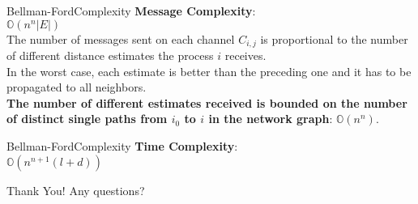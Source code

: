 \documentclass[pdf]{beamer}
\begin{document}
\begin{frame}{Bellman-Ford}{Complexity}
    \textbf{Message Complexity}: \\
    \vspace{8pt}
    $\mathbb{O}(n^n |E|)$ \\
    \vspace{8pt}
    \small
    The number of messages sent on each channel $C_{i, j}$ is proportional to the number of different distance estimates the process $i$ receives. \\
    \vspace{8pt}
    In the worst case, each estimate is better than the preceding one and it has to be propagated to all neighbors. \\
    \vspace{8pt}
    \textbf{The number of different estimates received is bounded on the number of distinct single paths from $i_0$ to $i$ in the network graph}: $\mathbb{O}(n^n)$.
\end{frame}

\begin{frame}{Bellman-Ford}{Complexity}
    \normalsize
    \textbf{Time Complexity}: \\
    \vspace{12pt}
    \pause
    $\mathbb{O}(n^{n+1}(l+d))$ \\
\end{frame}

\begin{frame}{Thank You!}
    \large
    Any questions?
\end{frame}
\end{document}
